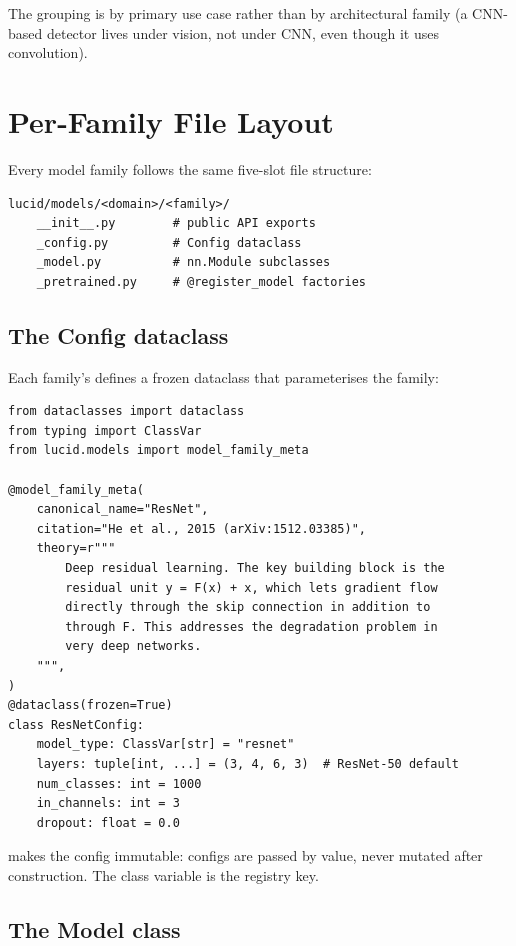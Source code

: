 The grouping is by primary use case rather than by
architectural family (a CNN-based detector lives under vision,
not under CNN, even though it uses convolution).

\section{Per-Family File Layout}
\label{sec:zoo_architecture:file_layout}

Every model family follows the same five-slot file structure:

\begin{lstlisting}
lucid/models/<domain>/<family>/
    __init__.py        # public API exports
    _config.py         # Config dataclass
    _model.py          # nn.Module subclasses
    _pretrained.py     # @register_model factories
\end{lstlisting}

\subsection{The Config dataclass}
\label{ssec:zoo_architecture:config_dataclass}

Each family's  defines a frozen dataclass that
parameterises the family:

\begin{lstlisting}[style=lucid,language=LucidPython]
from dataclasses import dataclass
from typing import ClassVar
from lucid.models import model_family_meta

@model_family_meta(
    canonical_name="ResNet",
    citation="He et al., 2015 (arXiv:1512.03385)",
    theory=r"""
        Deep residual learning. The key building block is the
        residual unit y = F(x) + x, which lets gradient flow
        directly through the skip connection in addition to
        through F. This addresses the degradation problem in
        very deep networks.
    """,
)
@dataclass(frozen=True)
class ResNetConfig:
    model_type: ClassVar[str] = "resnet"
    layers: tuple[int, ...] = (3, 4, 6, 3)  # ResNet-50 default
    num_classes: int = 1000
    in_channels: int = 3
    dropout: float = 0.0
\end{lstlisting}

 makes the config immutable: configs are passed
by value, never mutated after construction. The
 class variable is the registry key.

\subsection{The Model class}
\label{ssec:zoo_architecture:model_class}

